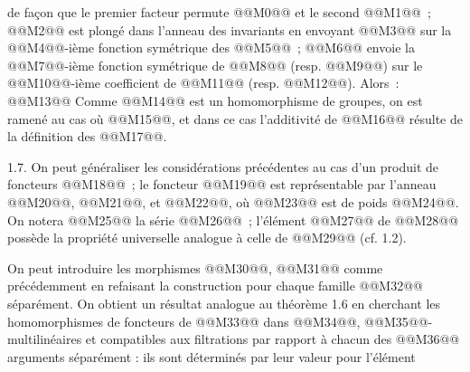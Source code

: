 
de façon que le
premier facteur permute @@M0@@ et le second @@M1@@~; @@M2@@ est plongé dans l'anneau des invariants en envoyant @@M3@@ sur la @@M4@@-ième fonction symétrique des @@M5@@~; @@M6@@ envoie la @@M7@@-ième fonction symétrique de @@M8@@ (resp. @@M9@@) sur le @@M10@@-ième coefficient de @@M11@@ (resp. @@M12@@). Alors~:
@@M13@@
Comme @@M14@@ est un homomorphisme de groupes, on est ramené au cas où @@M15@@, et dans ce cas l'additivité de @@M16@@ résulte de la définition des @@M17@@.

1.7. On peut généraliser les considérations précédentes au cas d'un produit de foncteurs @@M18@@~; le foncteur @@M19@@ est représentable par l'anneau
@@M20@@, @@M21@@, et @@M22@@, où @@M23@@ est de poids @@M24@@. On notera @@M25@@ la série @@M26@@~; l'élément @@M27@@ de @@M28@@ possède la propriété universelle analogue à celle de @@M29@@ (cf. 1.2).

On peut introduire les morphismes @@M30@@, @@M31@@ comme précédemment en refaisant la construction pour chaque famille @@M32@@ séparément. On obtient un résultat analogue au théorème 1.6 en cherchant les homomorphismes de foncteurs de @@M33@@ dans @@M34@@, @@M35@@-multilinéaires et compatibles aux filtrations par rapport à chacun des @@M36@@ arguments séparément : ils sont déterminés par leur valeur pour l'élément
